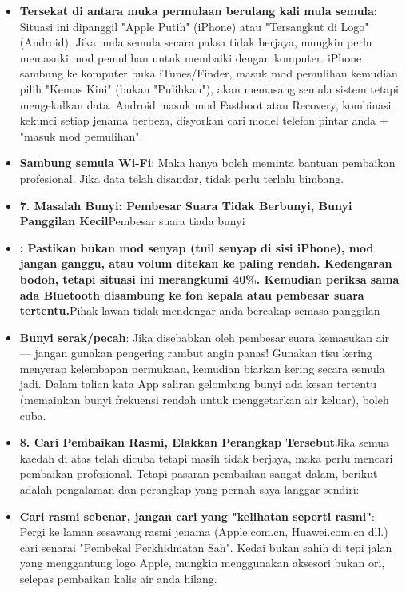 \begin{itemize}
  \item \textbf{Tersekat di antara muka permulaan berulang kali mula semula}: Situasi ini dipanggil "Apple Putih" (iPhone) atau "Tersangkut di Logo" (Android). Jika mula semula secara paksa tidak berjaya, mungkin perlu memasuki mod pemulihan untuk membaiki dengan komputer. iPhone sambung ke komputer buka iTunes/Finder, masuk mod pemulihan kemudian pilih "Kemas Kini" (bukan "Pulihkan"), akan memasang semula sistem tetapi mengekalkan data. Android masuk mod Fastboot atau Recovery, kombinasi kekunci setiap jenama berbeza, disyorkan cari model telefon pintar anda + "masuk mod pemulihan".
  \item \textbf{Sambung semula Wi-Fi}: Maka hanya boleh meminta bantuan pembaikan profesional. Jika data telah disandar, tidak perlu terlalu bimbang.
  \item \textbf{7. Masalah Bunyi: Pembesar Suara Tidak Berbunyi, Bunyi Panggilan Kecil}Pembesar suara tiada bunyi
  \item \textbf{: Pastikan bukan mod senyap (tuil senyap di sisi iPhone), mod jangan ganggu, atau volum ditekan ke paling rendah. Kedengaran bodoh, tetapi situasi ini merangkumi 40\%. Kemudian periksa sama ada Bluetooth disambung ke fon kepala atau pembesar suara tertentu.}Pihak lawan tidak mendengar anda bercakap semasa panggilan
\end{itemize}


\begin{itemize}
  \item \textbf{Bunyi serak/pecah}: Jika disebabkan oleh pembesar suara kemasukan air — jangan gunakan pengering rambut angin panas! Gunakan tisu kering menyerap kelembapan permukaan, kemudian biarkan kering secara semula jadi. Dalam talian kata App saliran gelombang bunyi ada kesan tertentu (memainkan bunyi frekuensi rendah untuk menggetarkan air keluar), boleh cuba.
  \item \textbf{8. Cari Pembaikan Rasmi, Elakkan Perangkap Tersebut}Jika semua kaedah di atas telah dicuba tetapi masih tidak berjaya, maka perlu mencari pembaikan profesional. Tetapi pasaran pembaikan sangat dalam, berikut adalah pengalaman dan perangkap yang pernah saya langgar sendiri:
  \item \textbf{Cari rasmi sebenar, jangan cari yang "kelihatan seperti rasmi"}: Pergi ke laman sesawang rasmi jenama (Apple.com.cn, Huawei.com.cn dll.) cari senarai "Pembekal Perkhidmatan Sah". Kedai bukan sahih di tepi jalan yang menggantung logo Apple, mungkin menggunakan aksesori bukan ori, selepas pembaikan kalis air anda hilang.
\end{itemize}

